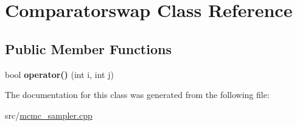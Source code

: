 \hypertarget{classComparatorswap}{}\section{Comparatorswap Class Reference}
\label{classComparatorswap}
\subsection*{Public Member Functions}
\begin{DoxyCompactItemize}
\item 
\mbox{\label{classComparatorswap_ae28720112064f56c7a762b4356a78e8a}} 
bool {\bfseries operator()} (int i, int j)
\end{DoxyCompactItemize}


The documentation for this class was generated from the following file\+:\begin{DoxyCompactItemize}
\item 
src/\hyperlink{mcmc__sampler_8cpp}{mcmc\+\_\+sampler.\+cpp}\end{DoxyCompactItemize}

